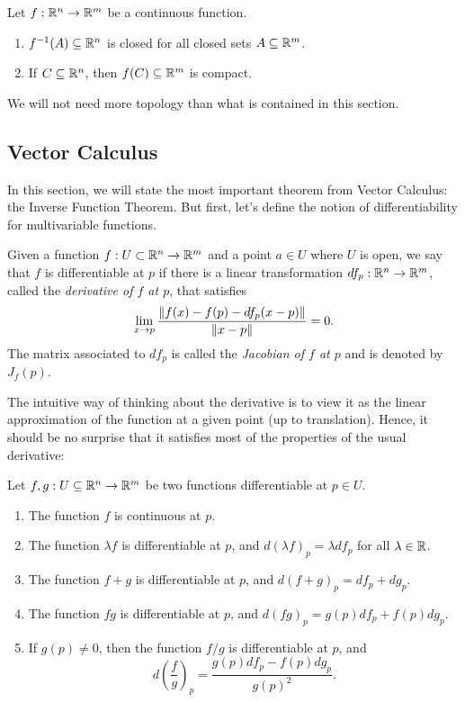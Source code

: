 \begin{proposition}
    Let $f : \mathbb{R}^n \to \mathbb{R}^m$ be a continuous function.
    \begin{enumerate}
        \item $f^{-1}(A) \subseteq \mathbb{R}^n$ is closed for all closed sets $A \subseteq \mathbb{R}^m$.
        \item If $C \subseteq \mathbb{R}^n$, then $f(C) \subseteq \mathbb{R}^m$ is compact.
    \end{enumerate}
\end{proposition}

We will not need more topology than what is contained in this section.

\subsection{Vector Calculus}

In this section, we will state the most important theorem from Vector Calculus: the Inverse Function Theorem. But first, let's define the notion of differentiability for multivariable functions.

\begin{definition}
    Given a function $f : U \subset \mathbb{R}^n \to \mathbb{R}^m$ and a point $a \in U$ where $U$ is open, we say that $f$ is differentiable at $p$ if there is a linear transformation $df_p : \mathbb{R}^n \to \mathbb{R}^m$, called the \textit{derivative of $f$ at $p$}, that satisfies
    $$\lim_{x \rightarrow p}\frac{\left\lVert f(x) - f(p) - df_p(x - p) \right\rVert}{\left\lVert x - p \right\rVert} = 0.$$
    The matrix associated to $df_p$ is called the \textit{Jacobian of $f$ at $p$} and is denoted by $J_f(p)$.
\end{definition}

The intuitive way of thinking about the derivative is to view it as the linear approximation of the function at a given point (up to translation). Hence, it should be no surprise that it satisfies most of the properties of the usual derivative:

\begin{proposition} Let $f, g : U \subseteq \mathbb{R}^n \to \mathbb{R}^m$ be two functions differentiable at $p \in U$.
    \begin{enumerate}
        \item The function $f$ is continuous at $p$.
        \item The function $\lambda f$ is differentiable at $p$, and $d(\lambda f)_p = \lambda df_p$ for all $\lambda \in \mathbb{R}$.
        \item The function $f + g$ is differentiable at $p$, and $d(f + g)_p = df_p + dg_p$.
        \item The function $fg$ is differentiable at $p$, and $d(fg)_p = g(p)df_p + f(p)dg_p$.
        \item If $g(p) \neq 0$, then the function $f/g$ is differentiable at $p$, and
        $$d\left(\frac{f}{g}\right)_p = \frac{g(p)df_p - f(p)dg_p}{g(p)^2}.$$
    \end{enumerate}
\end{proposition}

